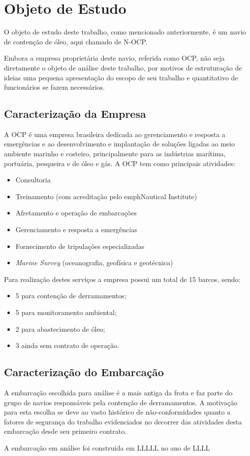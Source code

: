 \documentclass[../main.tex]{subfiles}
\begin{document}
\chapter{Objeto de Estudo}
O objeto de estudo deste trabalho, como mencionado anteriormente, é um navio de contenção de óleo, aqui chamado de N-OCP. 

Embora a empresa proprietária deste navio, referida como OCP, não seja diretamente o objeto de análise deste trabalho, por motivos de estruturação de ideias uma pequena apresentação do escopo de seu trabalho e quantitativo de funcionários se fazem necessários.

\section{Caracterização da Empresa}
A OCP é uma empresa brasileira dedicada ao gerenciamento e resposta a emergências e ao desenvolvimento e implantação de soluções ligadas ao meio ambiente marinho e costeiro, principalmente para as indústrias marítima, portuária, pesqueira e de óleo e gás.
A OCP tem como principais atividades:
\begin{itemize}
\item Consultoria
\item Treinamento (com acreditação pelo emph{Nautical Institute})
\item Afretamento e operação de embarcações
\item Gerenciamento e resposta a emergências
\item Fornecimento de tripulações especializadas
\item \emph{Marine Survey} (oceanografia, geofísica e geotécnica)
\end{itemize}

Para realização destes serviços a empresa possui um total de 15 barcos, sendo:
\begin{itemize}
\item 5 para contenção de derramamentos;
\item 5 para monitoramento ambiental;
\item 2 para abastecimento de óleo;
\item 3 ainda sem contrato de operação.
\end{itemize}

\section{Caracterização do Embarcação}
A embarcação escolhida para análise é a mais antiga da frota e faz parte do grupo de navios responsáveis pela contenção de derramamentos. A motivação para esta escolha se deve ao vasto histórico de não-conformidades quanto a fatores de segurança do trabalho evidenciados no decorrer das atividades desta embarcação desde seu primeiro contrato.

A embarcação em análise foi construída em LLLLL no ano de LLLL
\end{document}
